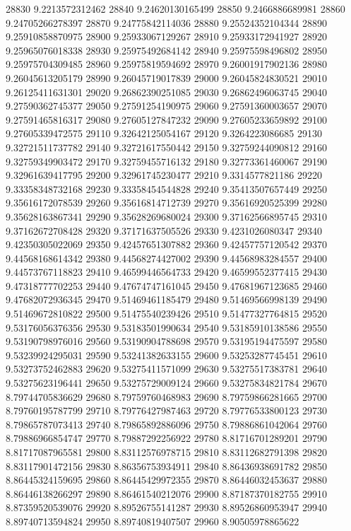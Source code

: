{28830 9.2213572312462
28840 9.24620130165499
28850 9.2466886689981
28860 9.24705266278397
28870 9.24775842114036
28880 9.25524352104344
28890 9.25910858870975
28900 9.25933067129267
28910 9.25933172941927
28920 9.25965076018338
28930 9.25975492684142
28940 9.25975598496802
28950 9.25975704309485
28960 9.25975819594692
28970 9.26001917902136
28980 9.26045613205179
28990 9.26045719017839
29000 9.26045824830521
29010 9.26125411631301
29020 9.26862390251085
29030 9.26862496063745
29040 9.27590362745377
29050 9.27591254190975
29060 9.27591360003657
29070 9.27591465816317
29080 9.27605127847232
29090 9.27605233659892
29100 9.27605339472575
29110 9.32642125054167
29120 9.3264223086685
29130 9.32721511737782
29140 9.32721617550442
29150 9.32759244090812
29160 9.32759349903472
29170 9.32759455716132
29180 9.32773361460067
29190 9.32961639417795
29200 9.32961745230477
29210 9.3314577821186
29220 9.33358348732168
29230 9.33358454544828
29240 9.35413507657449
29250 9.35616172078539
29260 9.35616814712739
29270 9.35616920525399
29280 9.35628163867341
29290 9.35628269680024
29300 9.37162566895745
29310 9.37162672708428
29320 9.37171637505526
29330 9.4231026080347
29340 9.42350305022069
29350 9.42457651307882
29360 9.42457757120542
29370 9.44568168614342
29380 9.44568274427002
29390 9.44568983284557
29400 9.44573767118823
29410 9.46599446564733
29420 9.46599552377415
29430 9.47318777702253
29440 9.47674747161045
29450 9.47681967123685
29460 9.47682072936345
29470 9.51469461185479
29480 9.51469566998139
29490 9.51469672810822
29500 9.51475540239426
29510 9.51477327764815
29520 9.53176056376356
29530 9.53183501990634
29540 9.53185910138586
29550 9.53190798976016
29560 9.53190904788698
29570 9.53195194475597
29580 9.53239924295031
29590 9.53241382633155
29600 9.53253287745451
29610 9.53273752462883
29620 9.53275411571099
29630 9.53275517383781
29640 9.53275623196441
29650 9.53275729009124
29660 9.53275834821784
29670 8.79744705836629
29680 8.79759760468983
29690 8.79759866281665
29700 8.79760195787799
29710 8.79776427987463
29720 8.79776533800123
29730 8.79865787073413
29740 8.79865892886096
29750 8.79886861042064
29760 8.79886966854747
29770 8.79887292256922
29780 8.81716701289201
29790 8.81717087965581
29800 8.83112576978715
29810 8.83112682791398
29820 8.83117901472156
29830 8.86356753934911
29840 8.86436938691782
29850 8.86445324159695
29860 8.86445429972355
29870 8.86446032453637
29880 8.86446138266297
29890 8.86461540212076
29900 8.87187370182755
29910 8.87359520539076
29920 8.89526755141287
29930 8.89526860953947
29940 8.89740713594824
29950 8.89740819407507
29960 8.90505978865622
}
